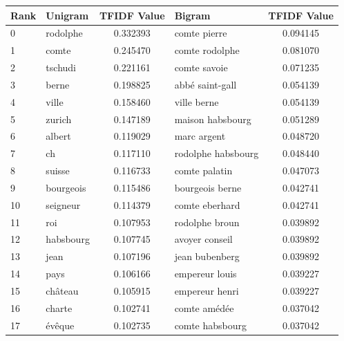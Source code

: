 \documentclass[11pt]{article}
\begin{document}
\begin{table}[H]
\begin{center}
\begin{small}
\label{TFIDF_Terms_Top_Twenty_hist_Fr}
\begin{tabular*}{\textwidth}{|l|| @{\extracolsep{\fill}} l c || l c |} 
\hline
Rank & Unigram & TFIDF Value  & Bigram & TFIDF Value \\
\hline
\hline
0   &     rodolphe  &  0.332393  &            comte pierre  &  0.094145  \\
1   &        comte  &  0.245470  &          comte rodolphe  &  0.081070  \\
2   &      tschudi  &  0.221161  &            comte savoie  &  0.071235  \\
3   &        berne  &  0.198825  &         abbé saint-gall  &  0.054139  \\
4   &        ville  &  0.158460  &             ville berne  &  0.054139  \\
5   &       zurich  &  0.147189  &        maison habsbourg  &  0.051289  \\
6   &       albert  &  0.119029  &             marc argent  &  0.048720  \\
7   &           ch  &  0.117110  &      rodolphe habsbourg  &  0.048440  \\
8   &       suisse  &  0.116733  &           comte palatin  &  0.047073  \\
9   &    bourgeois  &  0.115486  &         bourgeois berne  &  0.042741  \\
10  &     seigneur  &  0.114379  &          comte eberhard  &  0.042741  \\
11  &          roi  &  0.107953  &          rodolphe broun  &  0.039892  \\
12  &    habsbourg  &  0.107745  &          avoyer conseil  &  0.039892  \\
13  &         jean  &  0.107196  &          jean bubenberg  &  0.039892  \\
14  &         pays  &  0.106166  &          empereur louis  &  0.039227  \\
15  &      château  &  0.105915  &          empereur henri  &  0.039227  \\
16  &       charte  &  0.102741  &            comte amédée  &  0.037042  \\
17  &       évêque  &  0.102735  &         comte habsbourg  &  0.037042  \\

\end{tabular*}
\end{small}
\end{center}
\end{table}
\end{document}
